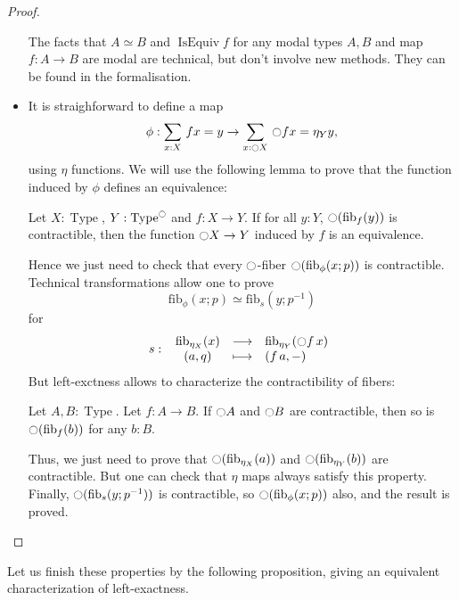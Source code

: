 \documentclass[notfinal]{jfrarticle}
\DeclareMathOperator{\Type}{Type}
\DeclareMathOperator{\IsEquiv}{IsEquiv}
\newcommand{\modal}{\ensuremath{\ocircle}}
\newcommand \fib[2] {\mathrm{fib}_{#1}(#2)}
\newcommand{\sumD}[3]{\sum_{#1:#2}\, #3}
\newcommand{\fonction}[5]{ %
	#1 \, \colon \left.
	 \begin{array}{ccl}
		#2 & \longrightarrow & #3 \\
		#4 & \longmapsto & #5
	\end{array}
	\right.
}
\begin{document}
\begin{proof}
\begin{itemize}
    The facts that $A\simeq B$ and $\IsEquiv f$ for any modal types
    $A,B$ and map $f:A\to B$ are modal are technical, but don't
    involve new methods. They can be found
    in the formalisation.
  \item 
    It is straighforward to define a map
    \[ \phi:\sumD x X  {f x = y}\to
    \sumD x {\modal X} {\modal f x = \eta_Y y},\]
    using $\eta$ functions.
    We will use the following lemma to prove that the function induced
    by $\phi$ defines an equivalence:
    \begin{lem}
      Let $X:\Type$, $Y:\Type^\modal$ and $f:X\to Y$. If for all $y:Y$,
      $\modal (\fib f y)$ is contractible, then the function $\modal X
      \to Y$ induced by $f$ is an equivalence.
    \end{lem}
    Hence we just need to check that every $\modal$-fiber $\modal(\fib \phi {x;p})$ is contractible.
    Technical transformations allow one to prove
    \[ \fib\phi{x;p} \simeq \fib s {y;p^{-1}}\]
    for
    \[
    \fonction{s}{\fib{\eta_X}x}{\fib{\eta_Y}{\modal f\, x}}{(a,q)}{(f\, a,-)}
    \]
    But left-exctness allows to characterize the contractibility of fibers:
    \begin{lem}
      Let $A,B:\Type$. Let $f:A\to B$. If $\modal A$ and $\modal B$ are
      contractible, then so is $\modal(\fib f b)$ for any $b:B$.
    \end{lem}
    Thus, we just need to prove that $\modal(\fib {\eta_X} a)$ and
    $\modal(\fib {\eta_Y} b)$ are contractible. But one can check that
    $\eta$ maps always satisfy this property.
    Finally, $\modal(\fib s{y;p^{-1}})$ is contractible, so $\modal(\fib
    \phi {x;p})$ also, and the result is proved.
  \end{itemize}

\end{proof}

Let us finish these properties by the following proposition, giving
an equivalent characterization of left-exactness.
\end{document}
